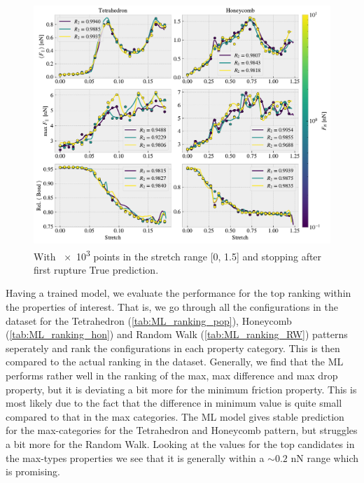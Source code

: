 \begin{figure}[H]
  \centering
  \includegraphics[width=\linewidth]{figures/ML/final_model_evaluation.pdf}
  \caption{With \num{e3} points in the stretch range [0, 1.5] and stopping after first rupture True prediction.}
  \label{fig:final_model_eval}
\end{figure}  

Having a trained model, we evaluate the performance for the top ranking within
the properties of interest. That is, we go through all the configurations in the
dataset for the Tetrahedron (\cref{tab:ML_ranking_pop}), Honeycomb
(\cref{tab:ML_ranking_hon}) and Random Walk (\cref{tab:ML_ranking_RW}) patterns
seperately and rank the configurations in each property category. This is then compared to the actual ranking in the dataset. Generally, we find that the \acrshort{ML} performs rather well in the ranking of the max, max difference and max drop property, but it is deviating a bit more for the minimum friction property. This is most likely due to the fact that the difference in minimum value is quite small compared to that in the max categories. The \acrshort{ML} model gives stable prediction for the max-categories for the Tetrahedron and Honeycomb pattern, but struggles a bit more for the Random Walk. Looking at the values for the top candidates in the max-types properties we see
that it is generally within a $\sim 0.2$ nN range which is promising. 

